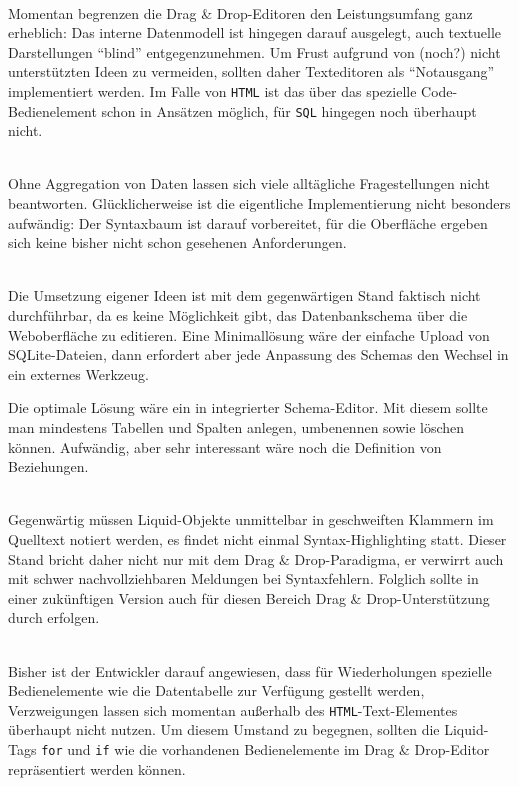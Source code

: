\begin{description}[noitemsep]
\item[Allgemein: Textuelle Editoren] \hfill\\
  Momentan begrenzen die Drag \& Drop-Editoren den Leistungsumfang ganz erheblich: Das interne Datenmodell ist hingegen darauf ausgelegt, auch textuelle Darstellungen "`blind"' entgegenzunehmen. Um Frust aufgrund von (noch?) nicht unterstützten Ideen zu vermeiden, sollten daher Texteditoren als "`Notausgang"' implementiert werden. Im Falle von \texttt{HTML} ist das über das spezielle Code-Bedienelement schon in Ansätzen möglich, für \texttt{SQL} hingegen noch überhaupt nicht.
  
\item[SQL: Unterstützung für Funktionen und \texttt{GROUP BY}] \hfill\\
  Ohne Aggregation von Daten lassen sich viele alltägliche Fragestellungen nicht beantworten. Glücklicherweise ist die eigentliche Implementierung nicht besonders aufwändig: Der Syntaxbaum ist darauf vorbereitet, für die Oberfläche ergeben sich keine bisher nicht schon gesehenen Anforderungen.
  
\item[SQL: Schemaeditor] \hfill\\
  Die Umsetzung eigener Ideen ist mit dem gegenwärtigen Stand faktisch nicht durchführbar, da es keine Möglichkeit gibt, das Datenbankschema über die Weboberfläche zu editieren. Eine Minimallösung wäre der einfache Upload von SQLite-Dateien, dann erfordert aber jede Anpassung des Schemas den Wechsel in ein externes Werkzeug.

  Die optimale Lösung wäre ein in \idename{} integrierter Schema-Editor. Mit diesem sollte man mindestens Tabellen und Spalten anlegen, umbenennen sowie löschen können. Aufwändig, aber sehr interessant wäre noch die Definition von Beziehungen.

\item[Seiten: Drag \& Drop für interpolierte Ausdrücke] \hfill\\
  Gegenwärtig müssen Liquid-Objekte unmittelbar in geschweiften Klammern im Quelltext notiert werden, es findet nicht einmal Syntax-Highlighting statt. Dieser Stand bricht daher nicht nur mit dem Drag \& Drop-Paradigma, er verwirrt auch mit schwer nachvollziehbaren Meldungen bei Syntaxfehlern. Folglich sollte in einer zukünftigen Version auch für diesen Bereich Drag \& Drop-Unterstützung durch \idename{} erfolgen.
  
\item[Seiten: Drag \& Drop für Kontrollstrukturen] \hfill\\
  Bisher ist der Entwickler darauf angewiesen, dass für Wiederholungen spezielle Bedienelemente wie die Datentabelle zur Verfügung gestellt werden, Verzweigungen lassen sich momentan außerhalb des \texttt{HTML}-Text-Elementes überhaupt nicht nutzen. Um diesem Umstand zu begegnen, sollten die Liquid-Tags \texttt{for} und \texttt{if} wie die vorhandenen Bedienelemente im Drag \& Drop-Editor repräsentiert werden können.  
\end{description}


